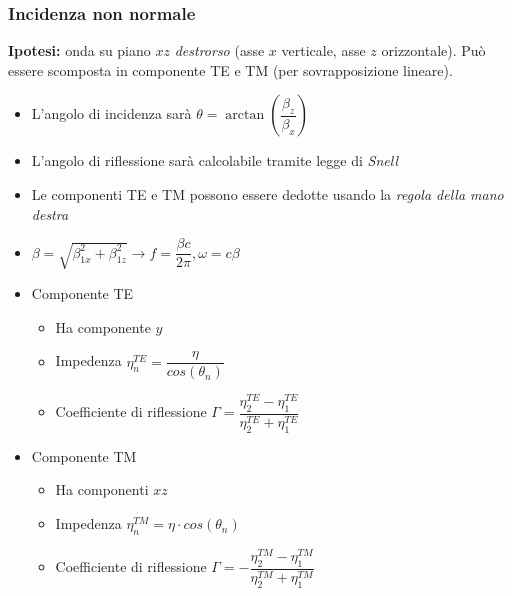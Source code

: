 \documentclass{article}
\begin{document}
\subsubsection{Incidenza non normale}
\textbf{Ipotesi:} onda su piano \(xz\) \textit{destrorso} (asse \(x\) verticale, asse \(z\) orizzontale). Può essere scomposta in componente TE e TM (per sovrapposizione lineare).
\begin{itemize}
	\item L'angolo di incidenza sarà \(\theta = \arctan\left(\dfrac{\beta_z}{\beta_x}\right)\)
	\item L'angolo di riflessione sarà calcolabile tramite legge di \textit{Snell}
	\item Le componenti TE e TM possono essere dedotte usando la \textit{regola della mano destra}
	\item \(\beta = \displaystyle \sqrt{\beta_{1x} ^ 2 + \beta_{1z} ^2} \rightarrow f = \dfrac{\beta c}{2 \pi}, \omega = c \beta \)
\end{itemize}
\begin{itemize}
	\item Componente TE
	\begin{itemize}
		\item Ha componente \(y\)
		\item Impedenza \( \displaystyle \eta^{TE}_n = \dfrac{\eta}{cos(\theta_n)} \)
		\item Coefficiente di riflessione \(\displaystyle \Gamma = \dfrac{\eta_{2}^{TE} - \eta_{1}^{TE}}{\eta_{2}^{TE} + \eta_{1}^{TE}} \)
	\end{itemize}
	\item Componente TM
	\begin{itemize}
		\item Ha componenti \(xz\)
		\item Impedenza \(\displaystyle \eta^{TM}_n = \eta \cdot cos(\theta_n) \)
		\item Coefficiente di riflessione \(\displaystyle \Gamma = - \dfrac{\eta_{2}^{TM} - \eta_{1}^{TM}}{\eta_{2}^{TM} + \eta_{1}^{TM}} \)
	\end{itemize}
\end{itemize}
\end{document}
